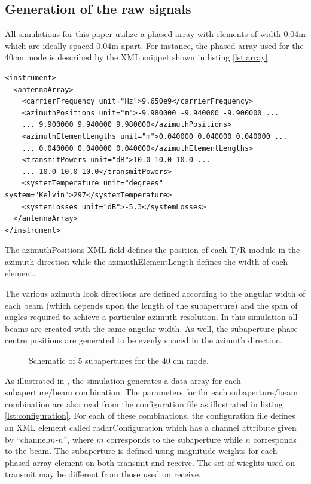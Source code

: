 \subsection{Generation of the raw signals}
All simulations for this paper utilize a phased array with elements of width 0.04m which are ideally spaced 0.04m apart. For instance, the phased array used for the 40cm mode is described by the XML snippet shown in listing \ref{lst:array}.
\lstset{language=XML}
\begin{lstlisting}[caption={Phased Array configuration}, label={lst:array}]
<instrument>
  <antennaArray>
    <carrierFrequency unit="Hz">9.650e9</carrierFrequency>
    <azimuthPositions unit="m">-9.980000 -9.940000 -9.900000 ...
    ... 9.900000 9.940000 9.980000</azimuthPositions>
    <azimuthElementLengths unit="m">0.040000 0.040000 0.040000 ...
    ... 0.040000 0.040000 0.040000</azimuthElementLengths>
    <transmitPowers unit="dB">10.0 10.0 10.0 ...
    ... 10.0 10.0 10.0</transmitPowers>
    <systemTemperature unit="degrees" system="Kelvin">297</systemTemperature>
    <systemLosses unit="dB">-5.3</systemLosses>
  </antennaArray>
</instrument>
\end{lstlisting}
The azimuthPositions XML field defines the position of each T/R module in the azimuth direction while the azimuthElementLength defines the width of each element.
\par
The various azimuth look directions are defined according to the angular width of each beam (which depends upon the length of the subaperture) and the span of angles required to achieve a particular azimuth resolution. In this simulation all beams are created with the same angular width. As well, the subaperture phase-centre positions are generated to be evenly spaced in the azimuth direction.
\begin{figure}[h!]
\begin{center}
 \resizebox{0.8\columnwidth}{!}{}
 \caption{Schematic of 5 subapertures for the 40 cm mode.}
 \label{fg:fivechansubaperture}
 \end{center}
\end{figure}
\par
As illustrated in , the simulation generates a data array for each subaperture/beam combination. The parameters for for each subaperture/beam combination are also read from the configuration file as illustrated in listing \ref{lst:configuration}. For each of these combinations, the configuration file defines an XML element called radarConfiguration which has a channel attribute given by ``channel$m$-$n$'', where $m$ corresponds to the subaperture while $n$ corresponds to the beam. The subaperture is defined using magnitude weights for each phased-array element on both transmit and receive. The set of wieghts used on transmit may be different from those used on receive. 
